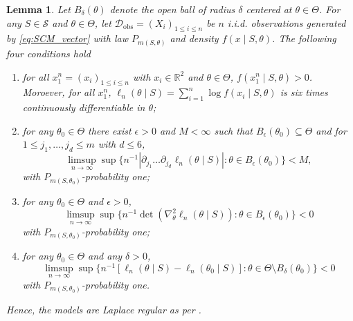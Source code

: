 \documentclass[accepted]{uai2026} %
\newcommand{\train}{\mathcal{D}}
\newcommand{\obsdata}{\train_{\text{obs}}}
\newtheorem{lemma}{Lemma}[section]
\theoremstyle{boldremark}
\begin{document}
\begin{lemma}
    \label{lemma:laplace_regular}
    Let $B_{\delta}(\theta)$ denote the open ball of radius $\delta$ centered at $\theta \in \Theta$. For any $S \in \mathcal{S}$ and $\theta \in \Theta$, let $\obsdata = (X_i)_{1\leq i \leq n}$ be $n$ i.i.d. observations generated by \eqref{eq:SCM_vector} with law $P_{m(S, \theta)}$ and density $f(x \mid S, \theta)$. The following four conditions hold
    
    \begin{enumerate}
    \item[(i)] for all $x_1^n = (x_i)_{1\leq i\leq n}$ with $x_i\in \mathbb{R}^2$  and $\theta \in \Theta$, $f(x_1^n\mid S, \theta)> 0$. Moroever, for all $x_1^n$, $\ell_n(\theta\mid S) = \sum_{i=1}^n  \log f(x_i\mid S, \theta)$ is six times continuously differentiable in $\theta$;
    \item[(ii)] for any $\theta_0 \in \Theta$ there exist $\epsilon > 0$ and $M < \infty$ such that $B_\epsilon(\theta_0) \subseteq \Theta$ and for $1 \le j_1, \dots, j_d \le m$ with $d \le 6$,
    \[
    \limsup_{n \to \infty}  \sup \{ n^{-1} | \partial_{j_1} \dots \partial_{j_d} \ell_n(\theta\mid S) | : \theta \in B_\epsilon(\theta_0) \} < M,
    \]
    with $P_{m(S,\theta_0)}$-probability one;
    \item[(iii)] for any $\theta_0 \in \Theta$ and $\epsilon > 0$,
    \[
    \limsup_{n \to \infty}  \sup \{ n^{-1} \det(\nabla^2_\theta \ell_n(\theta\mid S)) : \theta \in B_\epsilon(\theta_0) \} < 0
    \]
    with $P_{m(S, \theta_0)}$-probability one;
    \item[(iv)] for any $\theta_0 \in \Theta$ and any $\delta > 0$,
    \[
    \limsup_{n \to \infty} \sup \{ n^{-1} [\ell_n(\theta\mid S) - \ell_n(\theta_0\mid S)]: \theta \in \Theta \setminus B_\delta(\theta_0) \} < 0
    \]
    with $P_{m(S,\theta_0)}$-probability one.
\end{enumerate}
Hence, the models are Laplace regular as per \citet{Kass1990TheVO}.
\end{lemma}
\end{document}
